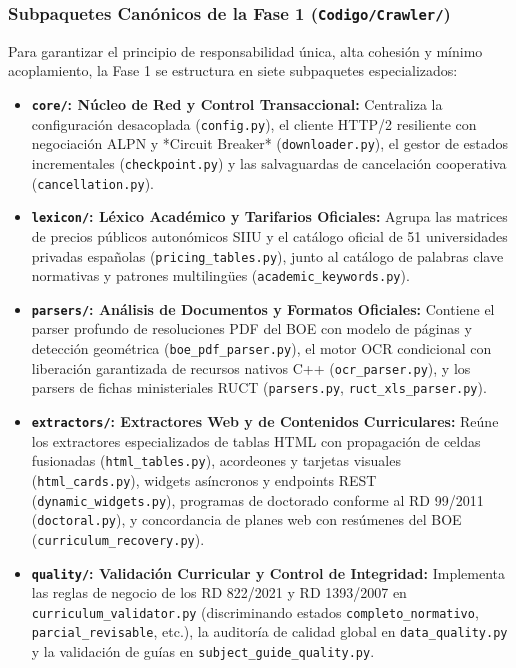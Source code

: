 \subsubsection{Subpaquetes Canónicos de la Fase 1 (\texttt{Codigo/Crawler/})}
Para garantizar el principio de responsabilidad única, alta cohesión y mínimo acoplamiento, la Fase 1 se estructura en siete subpaquetes especializados:
\begin{itemize}
    \item \textbf{\texttt{core/}: Núcleo de Red y Control Transaccional:} Centraliza la configuración desacoplada (\texttt{config.py}), el cliente HTTP/2 resiliente con negociación ALPN y *Circuit Breaker* (\texttt{downloader.py}), el gestor de estados incrementales (\texttt{checkpoint.py}) y las salvaguardas de cancelación cooperativa (\texttt{cancellation.py}).
    \item \textbf{\texttt{lexicon/}: Léxico Académico y Tarifarios Oficiales:} Agrupa las matrices de precios públicos autonómicos SIIU y el catálogo oficial de 51 universidades privadas españolas (\texttt{pricing\_tables.py}), junto al catálogo de palabras clave normativas y patrones multilingües (\texttt{academic\_keywords.py}).
    \item \textbf{\texttt{parsers/}: Análisis de Documentos y Formatos Oficiales:} Contiene el parser profundo de resoluciones PDF del BOE con modelo de páginas y detección geométrica (\texttt{boe\_pdf\_parser.py}), el motor OCR condicional con liberación garantizada de recursos nativos C++ (\texttt{ocr\_parser.py}), y los parsers de fichas ministeriales RUCT (\texttt{parsers.py}, \texttt{ruct\_xls\_parser.py}).
    \item \textbf{\texttt{extractors/}: Extractores Web y de Contenidos Curriculares:} Reúne los extractores especializados de tablas HTML con propagación de celdas fusionadas (\texttt{html\_tables.py}), acordeones y tarjetas visuales (\texttt{html\_cards.py}), widgets asíncronos y endpoints REST (\texttt{dynamic\_widgets.py}), programas de doctorado conforme al RD 99/2011 (\texttt{doctoral.py}), y concordancia de planes web con resúmenes del BOE (\texttt{curriculum\_recovery.py}).
    \item \textbf{\texttt{quality/}: Validación Curricular y Control de Integridad:} Implementa las reglas de negocio de los RD 822/2021 y RD 1393/2007 en \texttt{curriculum\_validator.py} (discriminando estados \texttt{completo\_normativo}, \texttt{parcial\_revisable}, etc.), la auditoría de calidad global en \texttt{data\_quality.py} y la validación de guías en \texttt{subject\_guide\_quality.py}.

\end{itemize}

